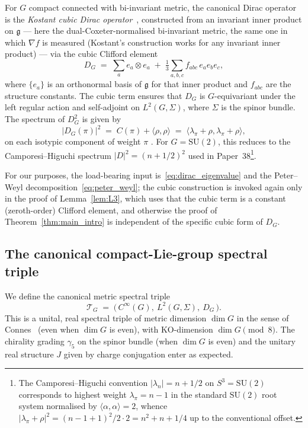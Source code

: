 \documentclass[11pt,a4paper]{article}
\theoremstyle{plain}
\theoremstyle{definition}
\newcommand{\Tcal}{\mathcal{T}}
\newcommand{\SU}{\mathrm{SU}}
\newcommand{\Cas}{C}
\newcommand{\Dop}{D}
\begin{document}
For $G$ compact connected with bi-invariant metric, the canonical
Dirac operator is the \emph{Kostant cubic Dirac operator}~\cite{kostant1999},
constructed from an invariant inner product on $\mathfrak g$ --- here
the dual-Coxeter-normalised bi-invariant metric, the same one in which
$\nabla f$ is measured (Kostant's construction works for any invariant
inner product) --- via the cubic Clifford element
\begin{equation}\label{eq:kostant_def}
   \Dop_G \;=\; \sum_a e_a \otimes e_a \;+\;
   \tfrac{1}{3}\sum_{a, b, c} f_{abc}\, e_a e_b e_c,
\end{equation}
where $\{e_a\}$ is an orthonormal basis of $\mathfrak g$ for that inner
product and $f_{abc}$
are the structure constants. The cubic term ensures that $\Dop_G$ is
$G$-equivariant under the left regular action and self-adjoint on
$L^2(G, \Sigma)$, where $\Sigma$ is the spinor bundle. The spectrum of
$\Dop_G^2$ is given by
\begin{equation}\label{eq:dirac_eigenvalue}
   |\Dop_G(\pi)|^2 \;=\; \Cas(\pi) + \langle \rho, \rho \rangle
   \;=\; \langle \lambda_\pi + \rho, \lambda_\pi + \rho \rangle,
\end{equation}
on each isotypic component of weight $\pi$
\cite{kostant1999, agricola2003}. For $G = \SU(2)$, this reduces to the
Camporesi--Higuchi spectrum $|\Dop|^2 = (n + 1/2)^2$ used in
Paper~38\footnote{The Camporesi--Higuchi convention $|\lambda_n| = n + 1/2$
on $S^3 = \SU(2)$ corresponds to highest weight $\lambda_\pi = n - 1$
in the standard $\SU(2)$ root system normalised by
$\langle\alpha, \alpha\rangle = 2$, whence
$|\lambda_\pi + \rho|^2 = (n - 1 + 1)^2/2 \cdot 2 = n^2 + n + 1/4$
up to the conventional offset.}.

For our purposes, the load-bearing input is~\eqref{eq:dirac_eigenvalue}
and the Peter--Weyl decomposition~\eqref{eq:peter_weyl}; the cubic
construction is invoked again only in the proof of Lemma~\ref{lem:L3},
which uses that the cubic term is a constant (zeroth-order) Clifford
element, and otherwise the proof of Theorem~\ref{thm:main_intro} is
independent of the specific cubic form of $\Dop_G$.

\subsection{The canonical compact-Lie-group spectral triple}

We define the canonical metric spectral triple
\begin{equation}\label{eq:Tcal_G_def}
   \Tcal_G \;=\; \bigl(\, C^\infty(G),\ L^2(G, \Sigma),\ \Dop_G \,\bigr).
\end{equation}
This is a unital, real spectral triple of metric dimension
$\dim G$ in the sense of Connes~\cite{connes1995} (even when $\dim G$
is even), with KO-dimension
$\dim G \pmod 8$. The chirality grading $\gamma_5$ on the spinor
bundle (when $\dim G$ is even) and the unitary real structure $J$
given by charge conjugation enter as expected.
\end{document}
